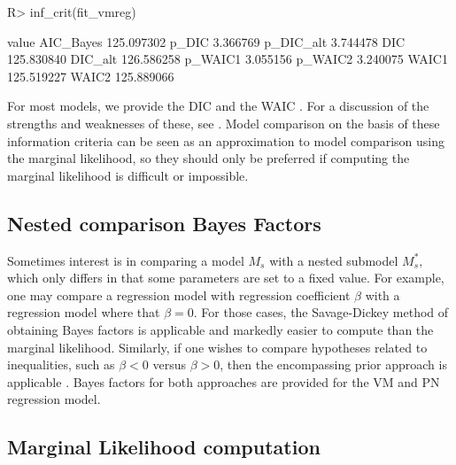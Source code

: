 \documentclass{article}
\newenvironment{CodeChunk}{}{}
\begin{document}
\begin{CodeChunk}
	
	\begin{CodeInput}
		R> inf_crit(fit_vmreg)
	\end{CodeInput}
	
	\begin{CodeOutput}
		value
		AIC_Bayes 125.097302
		p_DIC       3.366769
		p_DIC_alt   3.744478
		DIC       125.830840
		DIC_alt   126.586258
		p_WAIC1     3.055156
		p_WAIC2     3.240075
		WAIC1     125.519227
		WAIC2     125.889066
	\end{CodeOutput}
\end{CodeChunk}

For most models, we provide the DIC \citep{spiegelhalter2002bayesian}
and the WAIC \citep{watanabe2010asymptotic}. For a discussion of the
strengths and weaknesses of these, see
\citet[Ch. 7]{gelman2003bayesian}. Model comparison on the basis of
these information criteria can be seen as an approximation to model
comparison using the marginal likelihood, so they should only be
preferred if computing the marginal likelihood is difficult or
impossible.

\hypertarget{nested-comparison-bayes-factors}{%
	\subsection{Nested comparison Bayes
		Factors}\label{nested-comparison-bayes-factors}}

\label{sec:nested}

Sometimes interest is in comparing a model \(M_s\) with a nested
submodel \(M^\ast_s,\) which only differs in that some parameters are
set to a fixed value. For example, one may compare a regression model
with regression coefficient \(\beta\) with a regression model where that
\(\beta = 0.\) For those cases, the Savage-Dickey method of obtaining
Bayes factors is applicable
\citep{dickey1970weighted, o2004kendall, wagenmakers2010sdd} and
markedly easier to compute than the marginal likelihood. Similarly, if
one wishes to compare hypotheses related to inequalities, such as
\(\beta < 0\) versus \(\beta > 0\), then the encompassing prior approach
is applicable \citet{klugkist2005inequality, wetzels2010encompassing}.
Bayes factors for both approaches are provided for the VM and PN
regression model.

\hypertarget{marginal-likelihood-computation}{%
	\subsection{Marginal Likelihood
		computation}\label{marginal-likelihood-computation}}
\end{document}
